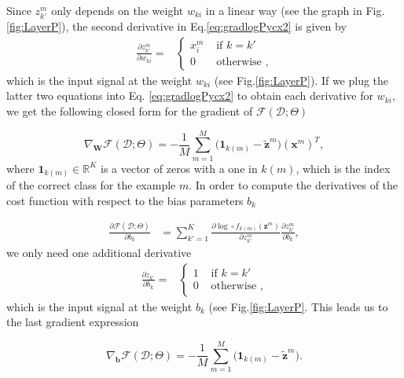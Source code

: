 %
Since $z^m_{k'}$ only depends on the weight $w_{ki}$ in a linear way (see the graph in Fig.\ref{fig:LayerP}), the second derivative in Eq.\ref{eq:gradlogPycx2} is given by
\begin{align}
\frac{\partial z^m_{k'}}{\partial w_{ki}} = 
  &\begin{cases}
      x_i^m  &  \mbox{ if } k = k'\\ 
      0    &  \mbox{ otherwise },
  \end{cases}
  \label{eq:partialLinear}
\end{align}
which is the input signal at the weight $w_{ki}$ (see Fig.\ref{fig:LayerP}).
If we plug the latter two equations into Eq. \ref{eq:gradlogPycx2} to obtain each 
derivative for $w_{ki}$, we get the following closed form for the gradient of $\mathcal{F}(\mathcal{D};\Theta)$

\begin{equation}
\nabla_\mathbf{W}\mathcal{F}(\mathcal{D};\Theta) = -\frac{1}{M}\sum_{m=1}^{M} \Big(\mathrm{\mathbf{1}}_{k(m)} - \tilde{\mathbf{z}}^m \Big) \left(\mathbf{x}^m\right)^T,  
\label{gradWeigths}
\end{equation}
%
where $\mathrm{\mathbf{1}}_{k(m)} \in \mathbb{R}^{K}$ is a vector of zeros with a one in $k(m)$, which is 
the index of the correct class for the example $m$. In order to compute
the derivatives of the cost function with respect to the bias parameters $b_{k}$

\begin{align}
\frac{\partial \mathcal{F}(\mathcal{D};\Theta)}{\partial b_{k}} & = \sum_{k'=1}^{K}\frac{\partial \log \circ f_{k(m)}(\mathbf{z}^m)}{\partial z^m_{k'}}\frac{\partial z^m_{k'}}{\partial b_{k}},
\end{align}
%
we only need one additional derivative
\begin{align}
\frac{\partial z_{k'}}{\partial b_{k}} = 
  &\begin{cases}
      1  &  \mbox{ if } k = k'\\ 
      0  &  \mbox{ otherwise },
  \end{cases} 
  \label{eqn:eqsilonq}
\end{align}
%
which is the input signal at the weight $b_k$ (see Fig.\ref{fig:LayerP}.
This leads us to the last gradient expression

\begin{equation}
\nabla_\mathbf{b}\mathcal{F}(\mathcal{D};\Theta) = -\frac{1}{M}\sum_{m=1}^{M} \Big(\mathrm{\mathbf{1}}_{k(m)} - \tilde{\mathbf{z}}^m \Big).
\label{eq:gradBias}
\end{equation}

